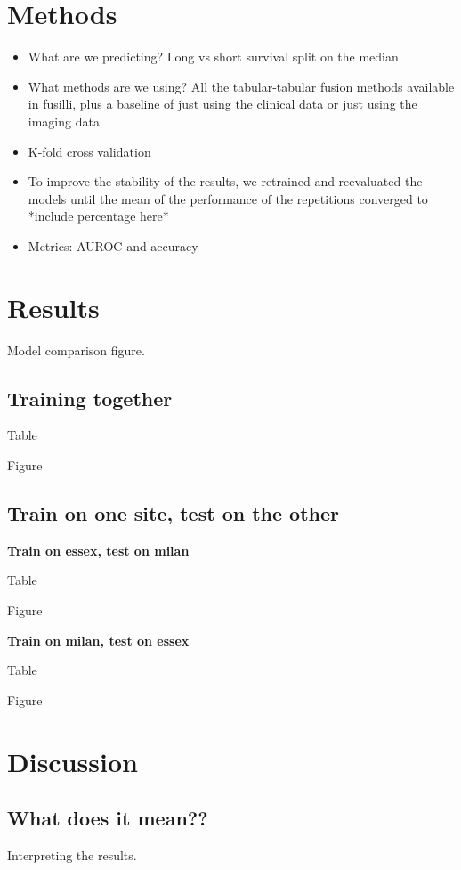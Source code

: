 \section{Methods}
\begin{itemize}
    \item What are we predicting? Long vs short survival split on the median
    \item What methods are we using? All the tabular-tabular fusion methods available in fusilli, plus a baseline of just using the clinical data or just using the imaging data
    \item K-fold cross validation
    \item To improve the stability of the results, we retrained and reevaluated the models until the mean of the performance of the repetitions converged to *include percentage here*
    \item Metrics: AUROC and accuracy
\end{itemize}

\section{Results}
Model comparison figure.

\subsection{Training together}

Table

Figure


\subsection{Train on one site, test on the other}

\textbf{Train on essex, test on milan}

Table

Figure

\textbf{Train on milan, test on essex}

Table

Figure

\section{Discussion}
\subsection{What does it mean??}
Interpreting the results.

